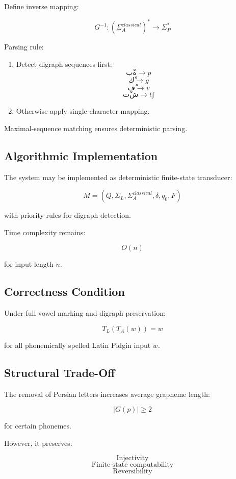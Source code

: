 \documentclass[12pt]{article}
\begin{document}
Define inverse mapping:

\[
G^{-1} : (\Sigma_A^{classical})^* \rightarrow \Sigma_P^*
\]

Parsing rule:

\begin{enumerate}
\item Detect digraph sequences first:
\[
بْه \rightarrow p
\]
\[
كْ \rightarrow g
\]
\[
فْ \rightarrow v
\]
\[
تْش \rightarrow tʃ
\]
\item Otherwise apply single-character mapping.
\end{enumerate}

Maximal-sequence matching ensures deterministic parsing.

\subsection{Algorithmic Implementation}

The system may be implemented as deterministic finite-state transducer:

\[
M = (Q, \Sigma_L, \Sigma_A^{classical}, \delta, q_0, F)
\]

with priority rules for digraph detection.

Time complexity remains:

\[
O(n)
\]

for input length \( n \).

\subsection{Correctness Condition}

Under full vowel marking and digraph preservation:

\[
T_L(T_A(w)) = w
\]

for all phonemically spelled Latin Pidgin input \( w \).

\subsection{Structural Trade-Off}

The removal of Persian letters increases average grapheme length:

\[
|G(p)| \ge 2
\]

for certain phonemes.

However, it preserves:

\[
\text{Injectivity}
\]
\[
\text{Finite-state computability}
\]
\[
\text{Reversibility}
\]
\end{document}

